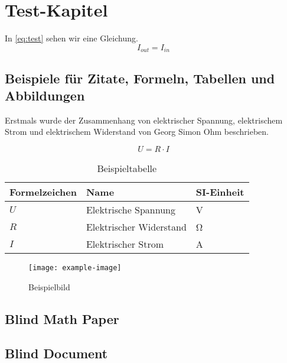\chapter{Test-Kapitel}

In \eqref{eq:test} sehen wir eine Gleichung.
\begin{equation}
    I_{out} = I_{in} \label{eq:test}
\end{equation}

\clearpage

\section{Beispiele für Zitate, Formeln, Tabellen und Abbildungen}
Erstmals wurde der Zusammenhang von elektrischer Spannung, elektrischem Strom und elektrischem Widerstand von Georg Simon Ohm beschrieben. \cite{Ohm.1827}

\begin{equation}
    U = R \cdot I
\end{equation}

\begin{table}[htbp]
    \centering
    \caption{Beispieltabelle}
    \label{tab:bsp-tabelle}
    \begin{tabular}{lll}
        \toprule
        \textbf{Formelzeichen} & \textbf{Name} & \textbf{SI-Einheit} \\
        \midrule
        $U$ & Elektrische Spannung & \si{\volt} \\
        $R$ & Elektrischer Widerstand & \si{\ohm} \\
        $I$ & Elektrischer Strom & \si{\ampere} \\
        \bottomrule
    \end{tabular}
\end{table}

\begin{figure}[htbp]
    \centering
    \texttt{[image: example-image]} %
    \caption{Beispielbild}
    \label{fig:bsp-bild}
\end{figure}

\clearpage

\section{Blind Math Paper}
\blindmathpaper %

\section{Blind Document}
\blinddocument %
